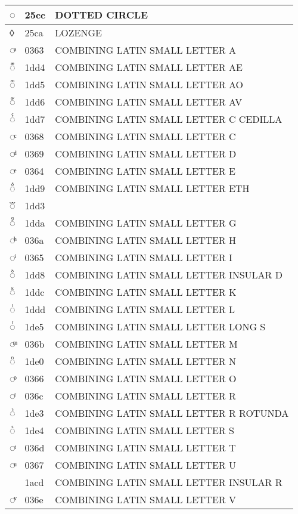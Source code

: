 \documentclass[12pt,letterpaper,openany]{book}
\begin{document}
\begin{center}
\begin{supertabular}{|m{0.25in}|m{0.5in}|m{4in}|}
◌ & 25cc & DOTTED CIRCLE\\\hline
◊ & 25ca & LOZENGE\\\hline
◌ͣ & 0363 & COMBINING LATIN SMALL LETTER A\\\hline
◌ᷔ & 1dd4 & COMBINING LATIN SMALL LETTER AE\\\hline
◌ᷕ & 1dd5 & COMBINING LATIN SMALL LETTER AO\\\hline
◌ᷖ & 1dd6 & COMBINING LATIN SMALL LETTER AV\\\hline
◌ᷗ & 1dd7 & COMBINING LATIN SMALL LETTER C CEDILLA\\\hline
◌ͨ & 0368 & COMBINING LATIN SMALL LETTER C\\\hline
◌ͩ & 0369 & COMBINING LATIN SMALL LETTER D\\\hline
◌ͤ & 0364 & COMBINING LATIN SMALL LETTER E\\\hline
◌ᷙ & 1dd9 & COMBINING LATIN SMALL LETTER ETH\\\hline
◌ᷓ & 1dd3 & \\\hline
◌ᷚ & 1dda & COMBINING LATIN SMALL LETTER G\\\hline
◌ͪ & 036a & COMBINING LATIN SMALL LETTER H\\\hline
◌ͥ & 0365 & COMBINING LATIN SMALL LETTER I\\\hline
◌ᷘ & 1dd8 & COMBINING LATIN SMALL LETTER INSULAR D\\\hline
◌ᷜ & 1ddc & COMBINING LATIN SMALL LETTER K\\\hline
◌ᷝ & 1ddd & COMBINING LATIN SMALL LETTER L\\\hline
◌ᷥ & 1de5 & COMBINING LATIN SMALL LETTER LONG S\\\hline
◌ͫ & 036b & COMBINING LATIN SMALL LETTER M\\\hline
◌ᷠ & 1de0 & COMBINING LATIN SMALL LETTER N\\\hline
◌ͦ & 0366 & COMBINING LATIN SMALL LETTER O\\\hline
◌ͬ & 036c & COMBINING LATIN SMALL LETTER R\\\hline
◌ᷣ & 1de3 & COMBINING LATIN SMALL LETTER R ROTUNDA\\\hline
◌ᷤ & 1de4 & COMBINING LATIN SMALL LETTER S\\\hline
◌ͭ & 036d & COMBINING LATIN SMALL LETTER T\\\hline
◌ͧ & 0367 & COMBINING LATIN SMALL LETTER U\\\hline
◌ᫍ & 1acd & COMBINING LATIN SMALL LETTER INSULAR R\\\hline
◌ͮ & 036e & COMBINING LATIN SMALL LETTER V\\\hline

\end{supertabular}
\end{center}
\end{document}
